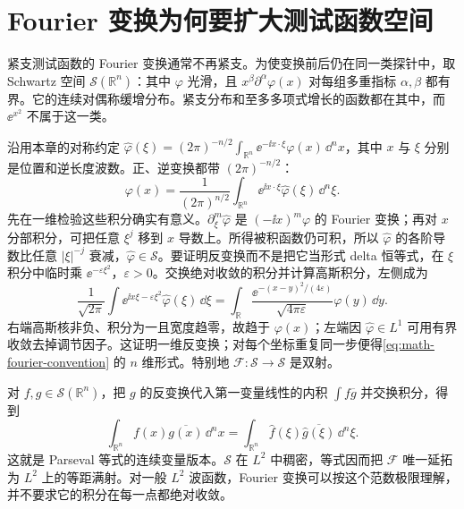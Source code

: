 \section{Fourier 变换为何要扩大测试函数空间}

紧支测试函数的 Fourier 变换通常不再紧支。为使变换前后仍在同一类探针中，取 Schwartz 空间 \(\mathcal S(\mathbb R^n)\)：其中 \(\varphi\) 光滑，且 \(x^\beta\partial^\alpha\varphi(x)\) 对每组多重指标 \(\alpha,\beta\) 都有界。它的连续对偶称缓增分布。紧支分布和至多多项式增长的函数都在其中，而 \(\ee^{x^2}\) 不属于这一类。

沿用本章的对称约定 \(\widehat\varphi(\xi)=(2\pi)^{-n/2}\int_{\mathbb R^n}\ee^{-\ii x\cdot\xi}\varphi(x)\,\dd^nx\)，其中 \(x\) 与 \(\xi\) 分别是位置和逆长度波数。正、逆变换都带 \((2\pi)^{-n/2}\)：
\begin{equation}
 \varphi(x)=\frac1{(2\pi)^{n/2}}\int_{\mathbb R^n}
 \ee^{\ii x\cdot\xi}\widehat\varphi(\xi)\,\dd^n\xi.
 \label{eq:math-fourier-convention}
\end{equation}
先在一维检验这些积分确实有意义。\(\partial_\xi^m\widehat\varphi\) 是 \((-\ii x)^m\varphi\) 的 Fourier 变换；再对 \(x\) 分部积分，可把任意 \(\xi^j\) 移到 \(x\) 导数上。所得被积函数仍可积，所以 \(\widehat\varphi\) 的各阶导数比任意 \(|\xi|^{-j}\) 衰减，\(\widehat\varphi\in\mathcal S\)。要证明反变换而不是把它当形式 delta 恒等式，在 \(\xi\) 积分中临时乘 \(\ee^{-\varepsilon\xi^2}\)，\(\varepsilon>0\)。交换绝对收敛的积分并计算高斯积分，左侧成为
\[
 \frac1{\sqrt{2\pi}}\int\ee^{\ii x\xi-\varepsilon\xi^2}\widehat\varphi(\xi)\,\dd\xi
 =\int_{\mathbb R}\frac{\ee^{-(x-y)^2/(4\varepsilon)}}{\sqrt{4\pi\varepsilon}}
 \varphi(y)\,\dd y.
\]
右端高斯核非负、积分为一且宽度趋零，故趋于 \(\varphi(x)\)；左端因 \(\widehat\varphi\in L^1\) 可用有界收敛去掉调节因子。这证明一维反变换；对每个坐标重复同一步便得\cref{eq:math-fourier-convention} 的 \(n\) 维形式。特别地 \(\mathcal F:\mathcal S\to\mathcal S\) 是双射。

对 \(f,g\in\mathcal S(\mathbb R^n)\)，把 \(g\) 的反变换代入第一变量线性的内积 \(\int f\overline g\) 并交换积分，得到
\begin{equation}
 \int_{\mathbb R^n}f(x)\overline{g(x)}\,\dd^nx
 =\int_{\mathbb R^n}
 \widehat f(\xi)\overline{\widehat g(\xi)}\,\dd^n\xi.
 \label{eq:math-fourier-plancherel}
\end{equation}
这就是 Parseval 等式的连续变量版本。\(\mathcal S\) 在 \(L^2\) 中稠密，等式因而把 $\mathcal F$ 唯一延拓为 \(L^2\) 上的等距满射。对一般 \(L^2\) 波函数，Fourier 变换可以按这个范数极限理解，并不要求它的积分在每一点都绝对收敛。

